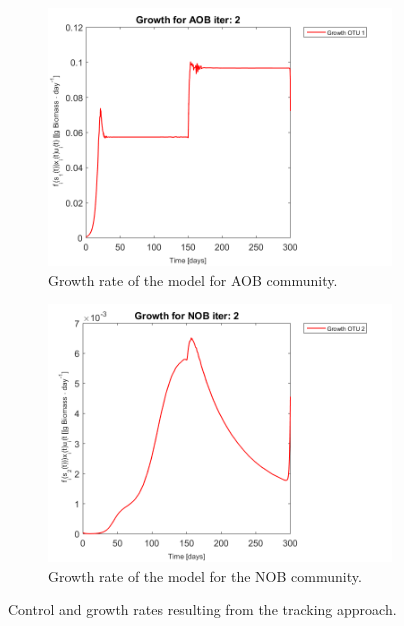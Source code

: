 \documentclass[3p,times]{article}
\begin{document}
\begin{figure}[h]
	\begin{subfigure}{0.45 \linewidth}
		\includegraphics[width=\linewidth]{proof_of_concept/250309_POC_try3_iter_2_growth_control_AOB_plot_1}
		\caption{Growth rate of the model for AOB community.}
		\label{AOB_growth_control_POC}
	\end{subfigure}
	\begin{subfigure}{0.45 \linewidth}
		\centering
		\includegraphics[width=\linewidth]{proof_of_concept/250309_POC_try3_iter_2_growth_control_NOB_plot_1}
		\caption{Growth rate of the model for the NOB community.}
		\label{NOB_growth_control_POC}
	\end{subfigure}
	\caption{Control and growth rates resulting from the tracking approach.}
	\label{POC_control}
\end{figure}
\end{document}
